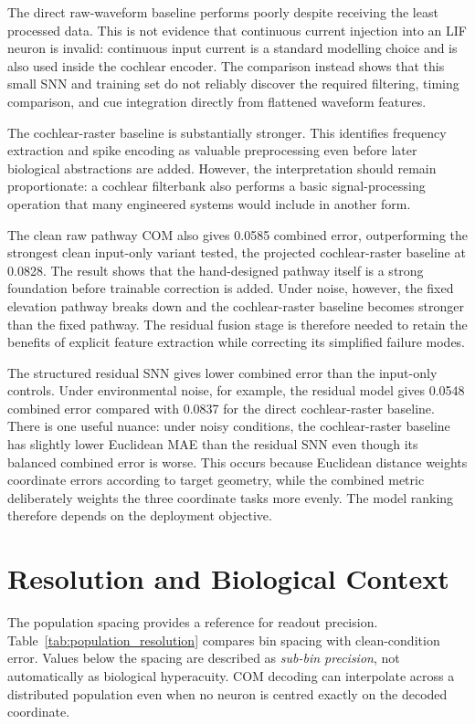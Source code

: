 The direct raw-waveform baseline performs poorly despite receiving the least processed data. This is not evidence that continuous current injection into an LIF neuron is invalid: continuous input current is a standard modelling choice and is also used inside the cochlear encoder. The comparison instead shows that this small SNN and training set do not reliably discover the required filtering, timing comparison, and cue integration directly from flattened waveform features.

The cochlear-raster baseline is substantially stronger. This identifies frequency extraction and spike encoding as valuable preprocessing even before later biological abstractions are added. However, the interpretation should remain proportionate: a cochlear filterbank also performs a basic signal-processing operation that many engineered systems would include in another form.

The clean raw pathway COM also gives 0.0585 combined error, outperforming the strongest clean input-only variant tested, the projected cochlear-raster baseline at 0.0828. The result shows that the hand-designed pathway itself is a strong foundation before trainable correction is added. Under noise, however, the fixed elevation pathway breaks down and the cochlear-raster baseline becomes stronger than the fixed pathway. The residual fusion stage is therefore needed to retain the benefits of explicit feature extraction while correcting its simplified failure modes.

The structured residual SNN gives lower combined error than the input-only controls. Under environmental noise, for example, the residual model gives 0.0548 combined error compared with 0.0837 for the direct cochlear-raster baseline. There is one useful nuance: under noisy conditions, the cochlear-raster baseline has slightly lower Euclidean MAE than the residual SNN even though its balanced combined error is worse. This occurs because Euclidean distance weights coordinate errors according to target geometry, while the combined metric deliberately weights the three coordinate tasks more evenly. The model ranking therefore depends on the deployment objective.

\section{Resolution and Biological Context}

The population spacing provides a reference for readout precision. Table~\ref{tab:population_resolution} compares bin spacing with clean-condition error. Values below the spacing are described as \emph{sub-bin precision}, not automatically as biological hyperacuity. COM decoding can interpolate across a distributed population even when no neuron is centred exactly on the decoded coordinate.

